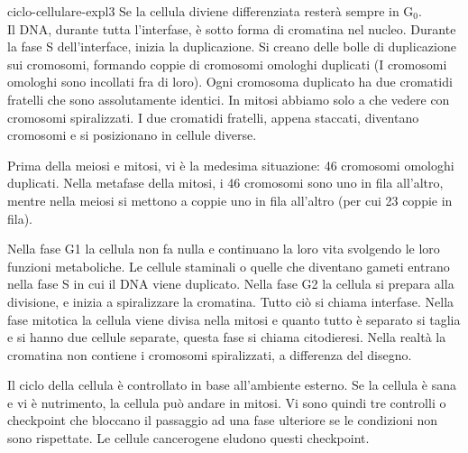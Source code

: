 \documentclass[preview]{standalone}
\begin{document}
\begin{snippet}{ciclo-cellulare-expl3}
    Se la cellula diviene differenziata resterà sempre in G\({}_0\).
    \\
    Il DNA, durante tutta l'interfase, è sotto forma di cromatina nel nucleo.
    Durante la fase S dell'interface, inizia la duplicazione.
    Si creano delle bolle di duplicazione sui cromosomi, formando
    coppie di cromosomi omologhi duplicati (I cromosomi omologhi sono incollati fra di loro).
    Ogni cromosoma duplicato ha due cromatidi fratelli che sono assolutamente identici.
    In mitosi abbiamo solo a che vedere con cromosomi spiralizzati.
    I due cromatidi fratelli, appena staccati, diventano cromosomi e si posizionano in cellule diverse.

    Prima della meiosi e mitosi, vi è la medesima situazione: 46 cromosomi omologhi duplicati.
    Nella metafase della mitosi, i 46 cromosomi sono uno in fila all'altro,
    mentre nella meiosi si mettono a coppie uno in fila all'altro (per cui 23 coppie in fila).

    Nella fase G1 la cellula non fa nulla e continuano la loro vita svolgendo le loro funzioni metaboliche. 
    Le cellule staminali o quelle che diventano gameti entrano nella fase S in cui il DNA viene duplicato. 
    Nella fase G2 la cellula si prepara alla divisione, e inizia a spiralizzare la cromatina. 
    Tutto ciò si chiama interfase.
    Nella fase mitotica la cellula viene divisa nella mitosi e quanto tutto è separato si taglia e si hanno due cellule separate, questa fase si chiama citodieresi.
    Nella realtà la cromatina non contiene i cromosomi spiralizzati, a differenza del disegno.

    Il ciclo della cellula è controllato in base all'ambiente esterno.
    Se la cellula è sana e vi è nutrimento, la cellula può andare in mitosi.
    Vi sono quindi tre controlli o checkpoint che bloccano il passaggio ad una fase ulteriore
    se le condizioni non sono rispettate.
    Le cellule cancerogene eludono questi checkpoint.
\end{snippet}

\end{document}
